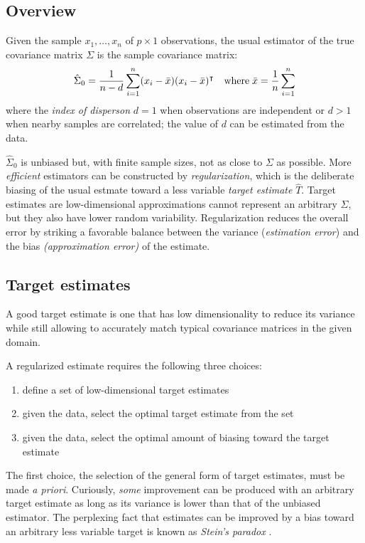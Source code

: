 \subsection{Overview}
Given the sample $x_1,\ldots,x_n$ of $p\times 1$ observations, the usual estimator of the true covariance matrix $\Sigma$ is  the sample covariance matrix:
\begin{equation}
\hat\Sigma_0 =  \frac 1 {n-d} \sum\limits_{i=1}^n (x_i - \bar x) (x_i - \bar x)^\intercal
\quad\mbox{where}\;
\bar x = \frac 1 n \sum\limits_{i=1}^n 
\end{equation}
where the \emph{index of disperson} $d=1$ when observations are independent or $d>1$ when nearby samples are correlated; the value of $d$ can be estimated from the data.

$\hat\Sigma_0$ is unbiased but, with finite sample sizes, not as close to $\Sigma$ as possible.  More \emph{efficient} estimators can be constructed by \emph{regularization}, which is the deliberate biasing of the usual estmate toward a less variable \emph{target estimate} $\hat T$. Target estimates are low-dimensional approximations cannot represent an arbitrary $\Sigma$, but they also have lower random variability.
Regularization reduces the overall error by striking a favorable balance between the variance  (\emph{estimation error}) and the bias \emph{(approximation error)} of the estimate.  
  
\subsection{Target estimates}
A good target estimate is one that has low dimensionality to reduce its variance while still allowing to accurately match typical covariance matrices in the given domain. 

A regularized estimate requires the following three choices: 
\begin{enumerate}[  1. ]
\item define a set of low-dimensional target estimates
\item given the data, select the optimal target estimate from the set 
\item given the data, select the optimal amount of biasing toward the target estimate
\end{enumerate}
The first choice, the selection of the general form of target estimates, must be made \emph{a priori}.  Curiously, \emph{some} improvement can be produced with an arbitrary target estimate as long as its variance is lower than that of the unbiased estimator.  The perplexing fact that estimates can be improved by a bias toward an arbitrary less variable target is known as \emph{Stein's paradox} \citep{Efron:1977}.  


